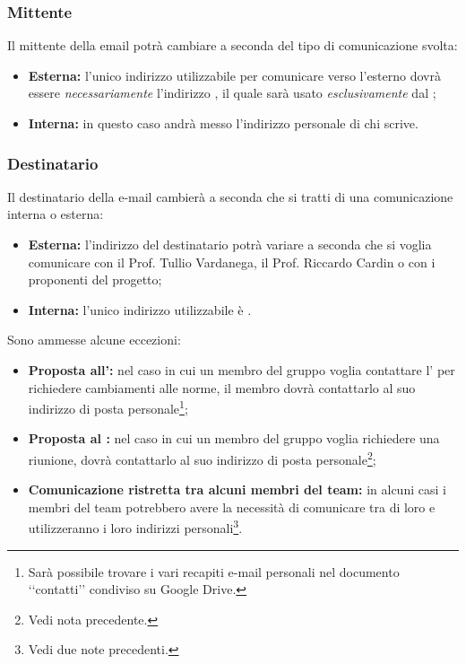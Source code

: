 \subsubsection{Mittente}
\label{mittente}
Il mittente della email potrà cambiare a seconda del tipo di comunicazione svolta:
\begin{itemize}
\item\textbf{Esterna:} l'unico indirizzo utilizzabile per comunicare verso l'esterno dovrà essere \textit{necessariamente} l'indirizzo \email, il quale sarà usato \textit{esclusivamente} dal \projectManager{};
\item \textbf{Interna:} in questo caso andrà messo l'indirizzo personale di chi scrive.
\end{itemize}

\subsubsection{Destinatario}
\label{destinatario}
Il destinatario della e-mail cambierà a seconda che si tratti di una comunicazione interna o esterna:
\begin{itemize}
\item \textbf{Esterna:} l'indirizzo del destinatario potrà variare a seconda che si voglia comunicare con il Prof. Tullio Vardanega, il Prof. Riccardo Cardin o con i proponenti del progetto;
\item \textbf{Interna:} l'unico indirizzo utilizzabile è \email.
\end{itemize}
Sono ammesse alcune eccezioni:
\begin{itemize}
\item \textbf{Proposta all'\administrator{}:} nel caso in cui un membro del gruppo voglia contattare l'\administrator{}
 per richiedere cambiamenti alle norme, il membro dovrà contattarlo al suo indirizzo di posta personale\footnote{Sarà possibile trovare i vari recapiti e-mail personali nel documento \lq\lq{}contatti\rq\rq{} condiviso su Google Drive.};
\item \textbf{Proposta al \projectManager{}:} nel caso in cui un membro del gruppo voglia richiedere una riunione, dovrà contattarlo al suo indirizzo di posta personale\footnote{Vedi nota precedente.};
\item \textbf{Comunicazione ristretta tra alcuni membri del team:} in alcuni casi i membri del team potrebbero avere la necessità di comunicare tra di loro e utilizzeranno i loro indirizzi personali\footnote{Vedi due note precedenti.}.
\end{itemize}

